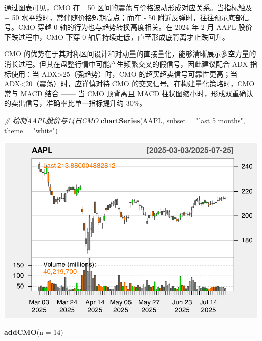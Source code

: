 \documentclass[]{ctexbook}
\newenvironment{Shaded}{\begin{snugshade}}{\end{snugshade}}
\newcommand{\AttributeTok}[1]{\textcolor[rgb]{0.13,0.29,0.53}{#1}}
\newcommand{\CommentTok}[1]{\textcolor[rgb]{0.56,0.35,0.01}{\textit{#1}}}
\newcommand{\DecValTok}[1]{\textcolor[rgb]{0.00,0.00,0.81}{#1}}
\newcommand{\FunctionTok}[1]{\textcolor[rgb]{0.13,0.29,0.53}{\textbf{#1}}}
\newcommand{\NormalTok}[1]{#1}
\newcommand{\StringTok}[1]{\textcolor[rgb]{0.31,0.60,0.02}{#1}}
\begin{document}
通过图表可见，CMO 在 ±50 区间的震荡与价格波动形成对应关系。当指标触及 + 50 水平线时，常伴随价格短期高点；而在 - 50 附近反弹时，往往预示底部信号。CMO 穿越 0 轴的行为也与趋势转换高度相关。在 2024 年 2 月 AAPL 股价下跌过程中，CMO 下穿 0 轴后持续走低，直至形成底背离才止跌回升。

CMO 的优势在于其对称区间设计和对动量的直接量化，能够清晰展示多空力量的消长过程。但其在盘整行情中可能产生频繁交叉的假信号，因此建议配合 ADX 指标使用：当 ADX\textgreater25（强趋势）时，CMO 的超买超卖信号可靠性更高；当 ADX\textless20（震荡）时，应谨慎对待 CMO 的交叉信号。在构建量化策略时，CMO 常与 MACD 结合 ------ 当 CMO 顶背离且 MACD 柱状图缩小时，形成双重确认的卖出信号，准确率比单一指标提升约 30\%。

\begin{Shaded}
\begin{Highlighting}[]
\CommentTok{\# 绘制AAPL股价与14日CMO}
\FunctionTok{chartSeries}\NormalTok{(AAPL, }\AttributeTok{subset =} \StringTok{"last 5 months"}\NormalTok{, }\AttributeTok{theme =} \StringTok{"white"}\NormalTok{)}
\end{Highlighting}
\end{Shaded}

\includegraphics[width=0.9\linewidth]{QuantmodHandbook_files/figure-latex/cmo_2-1}

\begin{Shaded}
\begin{Highlighting}[]
\FunctionTok{addCMO}\NormalTok{(}\AttributeTok{n =} \DecValTok{14}\NormalTok{)}
\end{Highlighting}
\end{Shaded}
\end{document}
